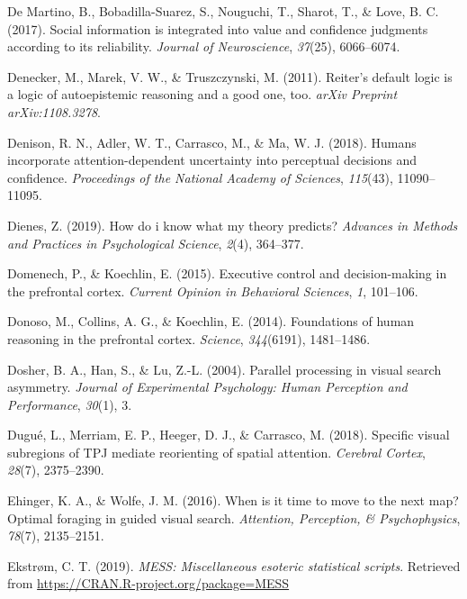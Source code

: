 \documentclass[12pt,twoside]{reedthesis}
\newenvironment{CSLReferences}%
  {}%
  {\par}
\begin{document}
\begin{CSLReferences}{1}{0}
\leavevmode\hypertarget{ref-de2017social}{}%
De Martino, B., Bobadilla-Suarez, S., Nouguchi, T., Sharot, T., \& Love, B. C. (2017). Social information is integrated into value and confidence judgments according to its reliability. \emph{Journal of Neuroscience}, \emph{37}(25), 6066--6074.

\leavevmode\hypertarget{ref-denecker2011reiter}{}%
Denecker, M., Marek, V. W., \& Truszczynski, M. (2011). Reiter's default logic is a logic of autoepistemic reasoning and a good one, too. \emph{arXiv Preprint arXiv:1108.3278}.

\leavevmode\hypertarget{ref-denison2018humans}{}%
Denison, R. N., Adler, W. T., Carrasco, M., \& Ma, W. J. (2018). Humans incorporate attention-dependent uncertainty into perceptual decisions and confidence. \emph{Proceedings of the National Academy of Sciences}, \emph{115}(43), 11090--11095.

\leavevmode\hypertarget{ref-dienes2019know}{}%
Dienes, Z. (2019). How do i know what my theory predicts? \emph{Advances in Methods and Practices in Psychological Science}, \emph{2}(4), 364--377.

\leavevmode\hypertarget{ref-domenech2015executive}{}%
Domenech, P., \& Koechlin, E. (2015). Executive control and decision-making in the prefrontal cortex. \emph{Current Opinion in Behavioral Sciences}, \emph{1}, 101--106.

\leavevmode\hypertarget{ref-donoso2014foundations}{}%
Donoso, M., Collins, A. G., \& Koechlin, E. (2014). Foundations of human reasoning in the prefrontal cortex. \emph{Science}, \emph{344}(6191), 1481--1486.

\leavevmode\hypertarget{ref-dosher2004parallel}{}%
Dosher, B. A., Han, S., \& Lu, Z.-L. (2004). Parallel processing in visual search asymmetry. \emph{Journal of Experimental Psychology: Human Perception and Performance}, \emph{30}(1), 3.

\leavevmode\hypertarget{ref-dugue2018specific}{}%
Dugué, L., Merriam, E. P., Heeger, D. J., \& Carrasco, M. (2018). Specific visual subregions of TPJ mediate reorienting of spatial attention. \emph{Cerebral Cortex}, \emph{28}(7), 2375--2390.

\leavevmode\hypertarget{ref-ehinger2016time}{}%
Ehinger, K. A., \& Wolfe, J. M. (2016). When is it time to move to the next map? Optimal foraging in guided visual search. \emph{Attention, Perception, \& Psychophysics}, \emph{78}(7), 2135--2151.

\leavevmode\hypertarget{ref-R-MESS}{}%
Ekstrøm, C. T. (2019). \emph{MESS: Miscellaneous esoteric statistical scripts}. Retrieved from \url{https://CRAN.R-project.org/package=MESS}


\end{CSLReferences}
\end{document}
